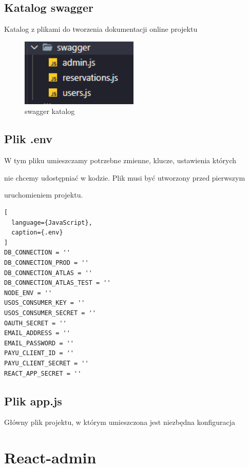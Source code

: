 \documentclass[titlepage]{article}
\begin{document}
\newpage
\subsection{Katalog swagger}
Katalog z plikami do tworzenia dokumentacji online projektu

\begin{figure}[h]
\centering
\includegraphics[width=0.5\textwidth]{swagger.png}
\caption{swagger katalog}
\label{fig:obrazek swagger}
\end{figure}

\subsection{Plik .env}
W tym pliku umieszczamy potrzebne zmienne, klucze, ustawienia których 

\newline
nie chcemy udostępniać w kodzie. Plik musi być utworzony przed pierwszym

\newline
uruchomieniem projektu.

\begin{lstlisting}[
  language={JavaScript},
  caption={.env}
]
DB_CONNECTION = ''
DB_CONNECTION_PROD = ''
DB_CONNECTION_ATLAS = ''
DB_CONNECTION_ATLAS_TEST = ''
NODE_ENV = ''
USOS_CONSUMER_KEY = ''
USOS_CONSUMER_SECRET = ''
OAUTH_SECRET = ''
EMAIL_ADDRESS = ''
EMAIL_PASSWORD = ''
PAYU_CLIENT_ID = ''
PAYU_CLIENT_SECRET = ''
REACT_APP_SECRET = ''

\end{lstlisting}

\subsection{Plik app.js}
Główny plik projektu, w którym umieszczona jest niezbędna konfiguracja

\newpage
\section{React-admin}
\end{document}
